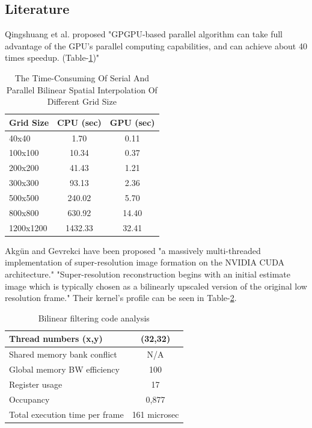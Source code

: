 \documentclass[]{article}
\begin{document}
	\subsection{Literature}
		\justifying Qingshuang et al.\cite{qingshuang2013parallel} proposed "GPGPU-based parallel algorithm can take full advantage of the GPU's parallel computing capabilities, and can achieve about 40 times speedup. (Table-\ref{tab:table_1})" \\
		\begin{table}[H] %
			\centering	
			\caption[The Time-Consuming Of Serial And Parallel Bilinear Spatial Interpolation Of Different Grid Size]{\justifying The Time-Consuming Of Serial And Parallel Bilinear Spatial Interpolation Of Different Grid Size \cite{qingshuang2013parallel}}
			\label{tab:table_1}
			\begin{tabular}{l c c }
				Grid Size & CPU (sec) & GPU (sec)\\ \hline\hline 
				40x40 & 1.70 & 0.11 \\  \hline
				100x100 & 10.34 & 0.37 \\ \hline
				200x200 & 41.43 & 1.21 \\ \hline
				300x300 & 93.13 & 2.36 \\ \hline
				500x500 & 240.02 & 5.70 \\ \hline
				800x800 & 630.92 & 14.40 \\ \hline
				1200x1200 & 1432.33 &  32.41 \\ \hline
			\end{tabular}
		\end{table}
		
		\justifying Akgün and Gevrekci have been proposed "a massively multi-threaded implementation of super-resolution image formation on the NVIDIA CUDA architecture." \cite{akgun2013accelerating} "Super-resolution reconstruction begins with an initial estimate image which is typically chosen as a bilinearly upscaled version of the original low resolution frame." Their kernel's profile can be seen in Table-\ref{tab:table_2}.
		\begin{table}[H] %
			\centering	
			\caption[Bilinear filtering code analysis]{Bilinear filtering code analysis \cite{akgun2013accelerating}}
			\label{tab:table_2}
			\begin{tabular}{l c}\hline\hline
				Thread numbers (x,y) &(32,32) \\ \hline 
				Shared memory bank conflict & N/A \\ \hline
				Global memory BW efficiency & 100 \\ \hline
				Register usage & 17 \\ \hline
				Occupancy & 0,877 \\ \hline
				Total execution time per frame & 161 microsec\\ \hline
			\end{tabular}
		\end{table}
\end{document}
